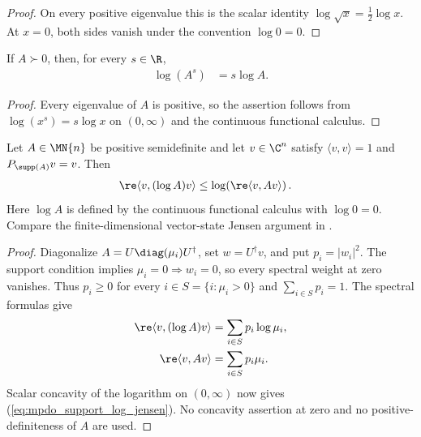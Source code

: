 \begin{proof}\leanok
    On every positive eigenvalue this is the scalar identity
    $\log\sqrt{x}=\frac12\log x$. At $x=0$, both sides vanish under the
    convention $\log0=0$.
\end{proof}

\begin{theorem}
    \label{thm:log_rpow_posdef}
    \leanok
    If $A\succ0$, then, for every $s\in\R$,
    \begin{align}
        \log(A^s) & =s\log A.
        \label{eq:mpdo_log_rpow}
    \end{align}
\end{theorem}

\begin{proof}\leanok
    Every eigenvalue of $A$ is positive, so the assertion follows from
    $\log(x^s)=s\log x$ on $(0,\infty)$ and the continuous functional
    calculus.
\end{proof}

\begin{theorem}
    \label{thm:support_log_vector_jensen}
    \leanok
    Let $A\in\MN{n}$ be positive semidefinite and let $v\in\C^n$ satisfy
    $\langle v,v\rangle=1$ and $P_{\supp(A)}v=v$. Then
    \begin{align}
        \re\langle v,(\log A)v\rangle
         & \leq\log\!\left(\re\langle v,Av\rangle\right).
        \label{eq:mpdo_support_log_jensen}
    \end{align}
    Here $\log A$ is defined by the continuous functional calculus with
    $\log 0=0$. Compare the finite-dimensional vector-state Jensen argument
    in \cite[Chapter~V]{Bhatia1997Matrix}.
\end{theorem}

\begin{proof}\leanok
    Diagonalize $A=U\diag(\mu_i)U^\dagger$, set $w=U^\dagger v$, and put
    $p_i=|w_i|^2$. The support condition implies
    $\mu_i=0\Longrightarrow w_i=0$, so every spectral weight at zero vanishes.
    Thus $p_i\geq0$ for every $i\in S=\{i:\mu_i>0\}$ and
    $\sum_{i\in S}p_i=1$. The spectral formulas give
    \begin{align}
        \re\langle v,(\log A)v\rangle
         & =\sum_{i\in S}p_i\log\mu_i, \notag \\
        \re\langle v,Av\rangle
         & =\sum_{i\in S}p_i\mu_i.
        \notag
    \end{align}
    Scalar concavity of the logarithm on $(0,\infty)$ now gives
    (\ref{eq:mpdo_support_log_jensen}). No concavity assertion at zero and no
    positive-definiteness of $A$ are used.
\end{proof}

